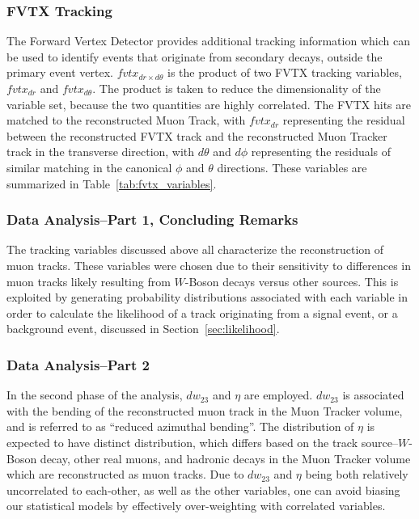 \subsubsection{FVTX Tracking}
The Forward Vertex Detector provides additional tracking information which can
be used to identify events that originate from secondary decays, outside the
primary event vertex. $fvtx_{dr \times d\theta}$ is the product of two FVTX
tracking variables, $fvtx_{dr}$ and $fvtx_{d\theta}$. The product is taken to
reduce the dimensionality of the variable set, because the two quantities are
highly correlated. The FVTX hits are matched to the reconstructed Muon Track,
with $fvtx_{dr}$ representing the residual between the reconstructed FVTX track
and the reconstructed Muon Tracker track in the transverse direction, with
$d\theta$ and $d\phi$ representing the residuals of similar matching in the
canonical $\phi$ and $\theta$ directions. These variables are summarized in
Table~\ref{tab:fvtx_variables}.

\subsubsection{Data Analysis--Part 1, Concluding Remarks}

The tracking variables discussed above all characterize the reconstruction of
muon tracks. These variables were chosen due to their sensitivity to differences
in muon tracks likely resulting from $W$-Boson decays versus other sources. This
is exploited by generating probability distributions associated with each
variable in order to calculate the likelihood of a track originating from a
signal event, or a background event, discussed in Section~\ref{sec:likelihood}.

\subsubsection{Data Analysis--Part 2}

In the second phase of the analysis, $dw_{23}$ and $\eta$ are employed.
$dw_{23}$ is associated with the bending of the reconstructed muon track in the
Muon Tracker volume, and is referred to as ``reduced azimuthal bending''. The
distribution of $\eta$ is expected to have distinct distribution, which differs
based on the track source--$W$-Boson decay, other real muons, and hadronic
decays in the Muon Tracker volume which are reconstructed as muon tracks. Due to
$dw_{23}$ and $\eta$ being both relatively uncorrelated to each-other, as well
as the other variables, one can avoid biasing our statistical models by
effectively over-weighting with correlated variables.

